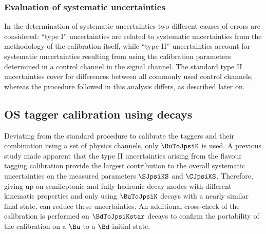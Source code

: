 \subsubsection{Evaluation of systematic uncertainties}
\label{sec:flavour_tagging:calibration:method:systematics}

In the determination of systematic uncertainties two different causes of errors
are considered: \enquote{type I} uncertainties are related to systematic
uncertainties from the methodology of the calibration itself, while
\enquote{type II} uncertainties account for systematic uncertainties resulting
from using the calibration parameters determined in a control channel in the
signal channel. The standard type II uncertainties cover for differences between
all commonly used control channels, whereas the procedure followed in this
analysis differs, as described later on.

\subsection[
  head={\ac*{OS} tagger calibration using \BuToJpsiK decays},
  tocentry={\ac*{OS} tagger calibration using \BuToJpsiKHyperref decays}
]{\ac*{OS} tagger calibration using \BuToJpsiKbfsf decays}
\label{sec:flavour_tagging:calibration:os}

Deviating from the standard procedure to calibrate the \OS taggers and their
combination using a set of physics channels, only $\BuToJpsiK$ is used. A
previous study \cite{Aaij:1497268} made apparent that the type II uncertainties
arising from the flavour tagging calibration provide the largest contribution to
the overall systematic uncertainties on the measured \CP parameters $\SJpsiKS$
and $\CJpsiKS$. Therefore, giving up on semileptonic and fully hadronic decay
modes with different kinematic properties and only using $\BuToJpsiK$ decays
with a nearly similar final state, can reduce these uncertainties. An additional
cross-check of the calibration is performed on $\BdToJpsiKstar$ decays to
confirm the portability of the calibration on a $\Bu$ to a $\Bd$ initial state.


